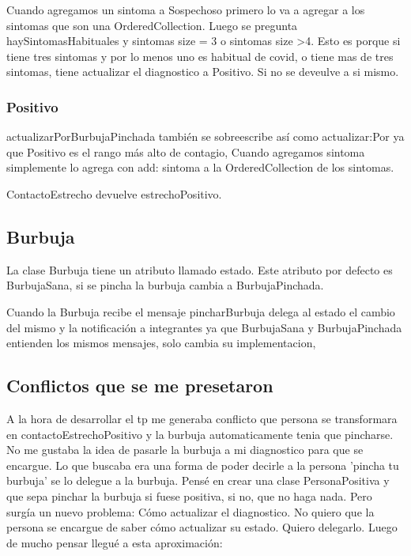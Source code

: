 \documentclass[titlepage,a4paper]{article}
\begin{document}
Cuando agregamos un sintoma a Sospechoso primero lo va a agregar a los sintomas que son una OrderedCollection.
Luego se pregunta haySintomasHabituales y sintomas size = 3 o sintomas size >4.
Esto es porque si tiene tres sintomas y por lo menos uno es habitual de covid, o tiene mas de tres sintomas, tiene actualizar el diagnostico a Positivo. Si no se deveulve a si mismo.

\subsubsection{Positivo}
actualizarPorBurbujaPinchada también se sobreescribe así como actualizar:Por ya que Positivo es el rango más alto de contagio,
Cuando agregamos sintoma simplemente lo agrega con add: sintoma a la OrderedCollection de los sintomas.

ContactoEstrecho devuelve estrechoPositivo.






\subsection{Burbuja}

La clase Burbuja tiene un atributo llamado estado. Este atributo por defecto es BurbujaSana, si se pincha la burbuja cambia a BurbujaPinchada.

Cuando la Burbuja recibe el mensaje pincharBurbuja delega al estado el cambio del mismo y la notificación a integrantes ya que BurbujaSana y BurbujaPinchada entienden los mismos mensajes, solo cambia su implementacion,



\subsection{Conflictos que se me presetaron}
A la hora de desarrollar el tp me generaba conflicto que persona se transformara en contactoEstrechoPositivo y la burbuja automaticamente tenia que pincharse. No me gustaba la idea de pasarle la burbuja a mi diagnostico para que se encargue. \newline
Lo que buscaba era una forma de poder decirle a la persona 'pincha tu burbuja' se lo delegue a la burbuja.
Pensé en crear una clase PersonaPositiva y que sepa pinchar la burbuja si fuese positiva, si no, que no haga nada. Pero surgía un   nuevo problema: Cómo actualizar el diagnostico. No quiero que la persona se encargue de saber cómo actualizar su estado. Quiero delegarlo.\newline
Luego de mucho pensar llegué a esta aproximación:\newline
\end{document}
